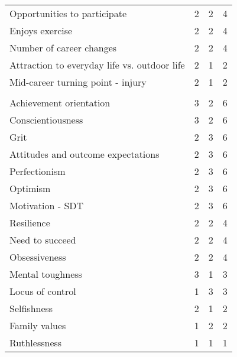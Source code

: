 \documentclass[
  12pt,
  a4paper,
]{book}
\begin{document}
\begin{table}
\begin{tabular}[t]{lrrr}
\hspace{1em}Opportunities to participate & 2 & 2 & 4\\
\hspace{1em}Enjoys exercise & 2 & 2 & 4\\
\hspace{1em}Number of career changes & 2 & 2 & 4\\
\hspace{1em}Attraction to everyday life vs. outdoor life & 2 & 1 & 2\\
\hspace{1em}Mid-career turning point - injury & 2 & 1 & 2\\
\addlinespace[0.3em]
\multicolumn{4}{l}{\textbf{Candidate personal characteristics}}\\
\hspace{1em}Achievement orientation & 3 & 2 & 6\\
\hspace{1em}Conscientiousness & 3 & 2 & 6\\
\hspace{1em}Grit & 2 & 3 & 6\\
\hspace{1em}Attitudes and outcome expectations & 2 & 3 & 6\\
\hspace{1em}Perfectionism & 2 & 3 & 6\\
\hspace{1em}Optimism & 2 & 3 & 6\\
\hspace{1em}Motivation - SDT & 2 & 3 & 6\\
\hspace{1em}Resilience & 2 & 2 & 4\\
\hspace{1em}Need to succeed & 2 & 2 & 4\\
\hspace{1em}Obsessiveness & 2 & 2 & 4\\
\hspace{1em}Mental toughness & 3 & 1 & 3\\
\hspace{1em}Locus of control & 1 & 3 & 3\\
\hspace{1em}Selfishness & 2 & 1 & 2\\
\hspace{1em}Family values & 1 & 2 & 2\\
\hspace{1em}Ruthlessness & 1 & 1 & 1\\

\end{tabular}
\end{table}
\end{document}
